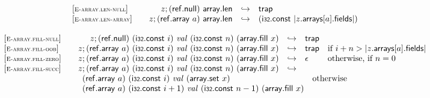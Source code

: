 \vspace{1ex}

$$
\begin{array}[t]{@{}lrcl@{}l@{}}
{[\textsc{\scriptsize E{-}array.len{-}null}]} \quad & z ; (\mathsf{ref{.}null})~\mathsf{array{.}len} & \hookrightarrow & \mathsf{trap} \\
{[\textsc{\scriptsize E{-}array.len{-}array}]} \quad & z ; (\mathsf{ref{.}array}~a)~\mathsf{array{.}len} & \hookrightarrow & (\mathsf{i{\scriptstyle 32}}{.}\mathsf{const}~{|z{.}\mathsf{arrays}{}[a]{.}\mathsf{fields}|}) \\
\end{array}
$$

\vspace{1ex}

$$
\begin{array}[t]{@{}lrcl@{}l@{}}
{[\textsc{\scriptsize E{-}array.fill{-}null}]} \quad & z ; (\mathsf{ref{.}null})~(\mathsf{i{\scriptstyle 32}}{.}\mathsf{const}~i)~{\mathit{val}}~(\mathsf{i{\scriptstyle 32}}{.}\mathsf{const}~n)~(\mathsf{array{.}fill}~x) & \hookrightarrow & \mathsf{trap} \\
{[\textsc{\scriptsize E{-}array.fill{-}oob}]} \quad & z ; (\mathsf{ref{.}array}~a)~(\mathsf{i{\scriptstyle 32}}{.}\mathsf{const}~i)~{\mathit{val}}~(\mathsf{i{\scriptstyle 32}}{.}\mathsf{const}~n)~(\mathsf{array{.}fill}~x) & \hookrightarrow & \mathsf{trap} & \quad \mbox{if}~ i + n > {|z{.}\mathsf{arrays}{}[a]{.}\mathsf{fields}|} \\
{[\textsc{\scriptsize E{-}array.fill{-}zero}]} \quad & z ; (\mathsf{ref{.}array}~a)~(\mathsf{i{\scriptstyle 32}}{.}\mathsf{const}~i)~{\mathit{val}}~(\mathsf{i{\scriptstyle 32}}{.}\mathsf{const}~n)~(\mathsf{array{.}fill}~x) & \hookrightarrow & \epsilon & \quad \mbox{otherwise, if}~ n = 0 \\
{[\textsc{\scriptsize E{-}array.fill{-}succ}]} \quad & z ; (\mathsf{ref{.}array}~a)~(\mathsf{i{\scriptstyle 32}}{.}\mathsf{const}~i)~{\mathit{val}}~(\mathsf{i{\scriptstyle 32}}{.}\mathsf{const}~n)~(\mathsf{array{.}fill}~x) & \hookrightarrow & & \\
& \multicolumn{4}{@{}l@{}}{\quad
\begin{array}[t]{@{}l@{}l@{}}
\begin{array}[t]{@{}l@{}} (\mathsf{ref{.}array}~a)~(\mathsf{i{\scriptstyle 32}}{.}\mathsf{const}~i)~{\mathit{val}}~(\mathsf{array{.}set}~x) \\
  (\mathsf{ref{.}array}~a)~(\mathsf{i{\scriptstyle 32}}{.}\mathsf{const}~i + 1)~{\mathit{val}}~(\mathsf{i{\scriptstyle 32}}{.}\mathsf{const}~n - 1)~(\mathsf{array{.}fill}~x) \end{array} & \quad \mbox{otherwise} \\

\end{array}}
\end{array}$$
